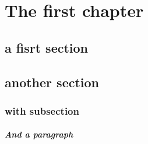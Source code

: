 \chapter{The first chapter}

\lipsum[1-8]
\section{a fisrt section}

\lipsum[1-10]

\section{another section}
\subsection{with subsection}
\paragraph{And a paragraph}
\lipsum[1-5]

\cite{dupont_artificial_2018}\\
\citep{pollitt_framework_2018}